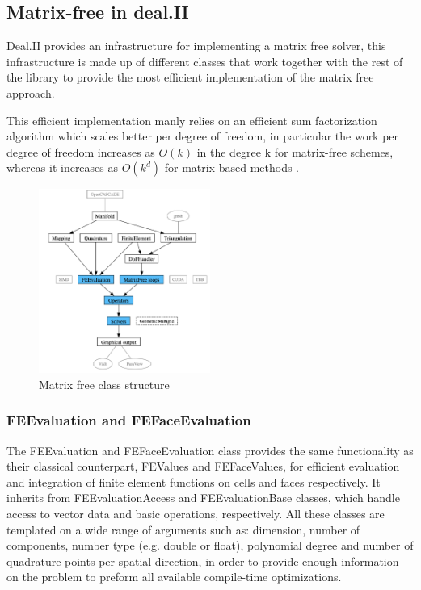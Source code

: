 \documentclass{article}
\begin{document}
\subsection{Matrix-free in deal.II}

Deal.II provides an infrastructure for implementing a matrix free solver, this infrastructure is made up of different classes that work together with the rest of the library to provide the most efficient implementation of the matrix free approach.

This efficient implementation manly relies on an efficient sum factorization algorithm which scales better per degree of freedom, in particular
the work per degree of freedom increases as \( O(k) \) in the degree k for matrix-free schemes, whereas it increases as \( O(k^d) \) for matrix-based methods \cite{dealii}.

\begin{figure}[h] %
    \centering
    \includegraphics[width=0.5\textwidth]{figure/class_structure.png}
    \caption{Matrix free class structure}
    \label{fig:class_structure}
\end{figure}

\subsubsection{FEEvaluation and FEFaceEvaluation}

The FEEvaluation and FEFaceEvaluation class provides the same functionality as their classical counterpart, FEValues and FEFaceValues, for efficient evaluation and integration of finite element functions on cells and faces respectively. It inherits from FEEvaluationAccess and FEEvaluationBase classes, which handle access to vector data and basic operations, respectively. All these classes are templated on a wide range of arguments such as: dimension, number of components, number type (e.g. double or float), polynomial degree and number of quadrature points per spatial direction, in order to provide enough information on the problem to preform all available compile-time optimizations.
\end{document}
